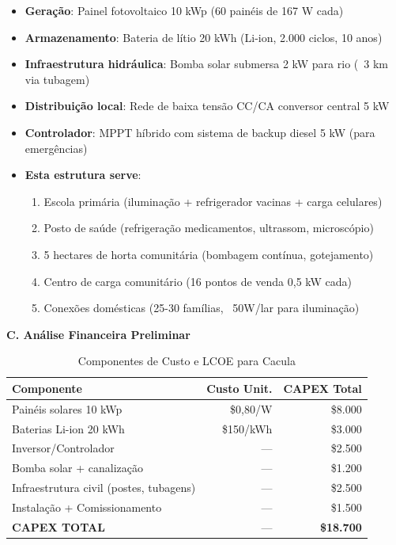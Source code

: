 \documentclass[12pt, a4paper]{article}
\begin{document}
\begin{itemize}
\item \textbf{Geração}: Painel fotovoltaico 10 kWp (60 painéis de 167 W cada)
\item \textbf{Armazenamento}: Bateria de lítio 20 kWh (Li-ion, 2.000 ciclos, 10 anos)
\item \textbf{Infraestrutura hidráulica}: Bomba solar submersa 2 kW para rio (~3 km via tubagem)
\item \textbf{Distribuição local}: Rede de baixa tensão CC/CA conversor central 5 kW
\item \textbf{Controlador}: MPPT híbrido com sistema de backup diesel 5 kW (para emergências)
\item \textbf{Esta estrutura serve}:
  \begin{enumerate}
  \item Escola primária (iluminação + refrigerador vacinas + carga celulares)
  \item Posto de saúde (refrigeração medicamentos, ultrassom, microscópio)
  \item 5 hectares de horta comunitária (bombagem contínua, gotejamento)
  \item Centro de carga comunitário (16 pontos de venda 0,5 kW cada)
  \item Conexões domésticas (25-30 famílias, ~50W/lar para iluminação)
  \end{enumerate}
\end{itemize}

\textbf{C. Análise Financeira Preliminar}

\begin{table}[H]
\centering
\caption{Componentes de Custo e LCOE para Cacula}
\label{tab:cacula_lcoe}
\small
\begin{tabular}{|l|r|r|}
\hline
\textbf{Componente} & \textbf{Custo Unit.} & \textbf{CAPEX Total} \\
\hline
Painéis solares 10 kWp & \$0,80/W & \$8.000 \\
Baterias Li-ion 20 kWh & \$150/kWh & \$3.000 \\
Inversor/Controlador & --- & \$2.500 \\
Bomba solar + canalização & --- & \$1.200 \\
Infraestrutura civil (postes, tubagens) & --- & \$2.500 \\
Instalação + Comissionamento & --- & \$1.500 \\
\hline
\textbf{CAPEX TOTAL} & --- & \textbf{\$18.700} \\
\hline
\end{tabular}
\end{table}
\end{document}

